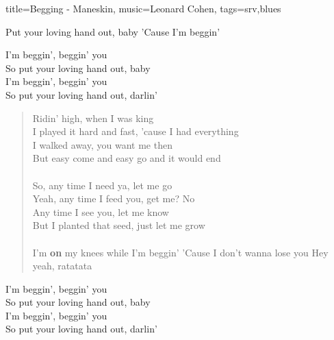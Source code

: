 \begin{song}{title={Begging - Maneskin}, music={Leonard Cohen}, tags={srv,blues}}
\begin{intro}
	Put your loving hand out, baby
	'Cause I'm beggin'
\end{intro}
\begin{chorus}
  I'm beggin', beggin' you \\
  So put your loving hand out, baby \\
  I'm beggin', beggin' you \\
  So put your loving hand out, darlin'
\end{chorus}

\begin{verse}
	Ridin' high, when I was king \\
	I played it hard and fast, 'cause I had everything \\
	I walked away, you want me then \\
	But easy come and easy go and it would end \\ \\
	So, any time I need ya, let me go \\
	Yeah, any time I feed you, get me? No \\
	Any time I see you, let me know \\
	But I planted that seed, just let me grow \\ \\
	I'm \textbf{on} my knees while I'm beggin'
	'Cause I don't wanna lose you
	Hey yeah, ratatata	
\end{verse}

\begin{chorus}
	I'm beggin', beggin' you \\
	So put your loving hand out, baby \\
	I'm beggin', beggin' you \\
	So put your loving hand out, darlin'
\end{chorus}


\end{song}
